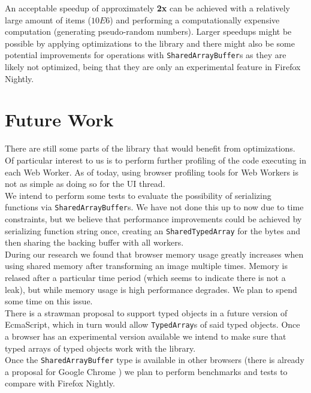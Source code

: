 \documentclass[runningheads,a4paper]{llncs}
\begin{document}
An acceptable speedup of approximately \textbf{2x} can be achieved with a relatively large amount of items (\(10E6\)) and performing a computationally expensive computation (generating pseudo-random numbers). Larger speedups might be possible by applying optimizations to the library and there might also be some potential improvements for operations with \verb+SharedArrayBuffer+s as they are likely not optimized, being that they are only an experimental feature in Firefox Nightly.

\section{Future Work}\label{sec:future}
There are still some parts of the library that would benefit from optimizations. Of particular interest to us is to perform further profiling of the code executing in each Web Worker. As of today, using browser profiling tools for Web Workers is not as simple as doing so for the UI thread.\\

We intend to perform some tests to evaluate the possibility of serializing functions via \verb+SharedArrayBuffer+s. We have not done this up to now due to time constraints, but we believe that performance improvements could be achieved by serializing function string once, creating an \verb+SharedTypedArray+ for the bytes and then sharing the backing buffer with all workers.\\

During our research we found that browser memory usage greatly increases when using shared memory after transforming an image multiple times. Memory is relased after a particular time period (which seems to indicate there is not a leak), but while memory usage is high performance degrades. We plan to spend some time on this issue.\\

There is a strawman proposal to support typed objects \cite{typed-objects} in a future version of EcmaScript, which in turn would allow \verb+TypedArray+s of said typed objects. Once a browser has an experimental version available we intend to make sure that typed arrays of typed objects work with the library.\\

Once the \verb+SharedArrayBuffer+ type is available in other browsers (there is already a proposal for Google Chrome \cite{sab-chrome}) we plan to perform benchmarks and tests to compare with Firefox Nightly.
\end{document}

